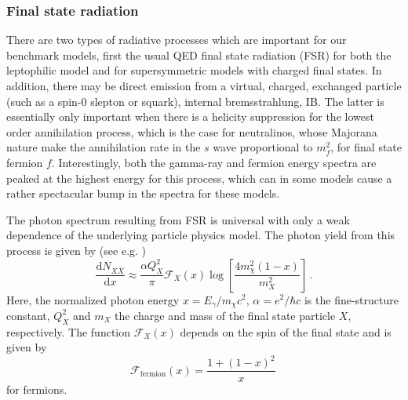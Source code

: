 \documentclass[10pt,aps,pra,reprint,amsmath,amsfonts,amssymb,showpacs,nofootinbib,floatfix]{revtex4-1}
\newcommand{\rmn}{\mathrm}
\newcommand{\dd}{\rmn{d}}
\newcommand{\eg}{E_\gamma}
\begin{document}
\subsubsection{Final state radiation}
There are two types of radiative processes which are important for our
benchmark models, first the usual QED final state radiation (FSR) for
both the leptophilic model and for supersymmetric models with charged
final states. In addition, there may be direct emission from a
virtual, charged, exchanged particle (such as a spin-0 slepton or
squark), internal bremsstrahlung, IB. The latter is essentially only
important when there is a helicity suppression for the lowest order
annihilation process, which is the case for neutralinos, whose
Majorana nature make the annihilation rate in the $s$ wave
proportional to $m_f^2$, for final state fermion $f$. Interestingly,
both the gamma-ray and fermion energy spectra are peaked at the
highest energy for this process, which can in some models cause a
rather spectacular bump in the spectra for these models.

The photon spectrum resulting from FSR is universal with only a
weak dependence of the underlying particle physics model. The photon
yield from this process is given by (see
e.g. \cite{2008JHEP...01..049B})
\begin{equation}
\frac{\dd N_{X \bar{X}}}{\dd x} \approx \frac{\alpha Q_X^2}{\pi}
\mathcal{F}_X(x) \log\left[\frac{4 m_\chi^2\left(1-x\right)}{m_X^2}\right]\,.
\end{equation}
Here, the normalized photon energy $x=\eg/m_\chi c^2$, 
$\alpha =e^2/\hbar c$ is the fine-structure constant, 
$Q_X^2$ and $m_X$ the
charge and mass of the final state particle $X$, respectively. The function
$\mathcal{F}_X(x)$ depends on the spin of the final state and is given
by
\begin{equation}
\mathcal{F}_\rmn{fermion}(x) = \frac{1+\left(1-x\right)^2}{x}\,
\end{equation}
for fermions. 
\end{document}

